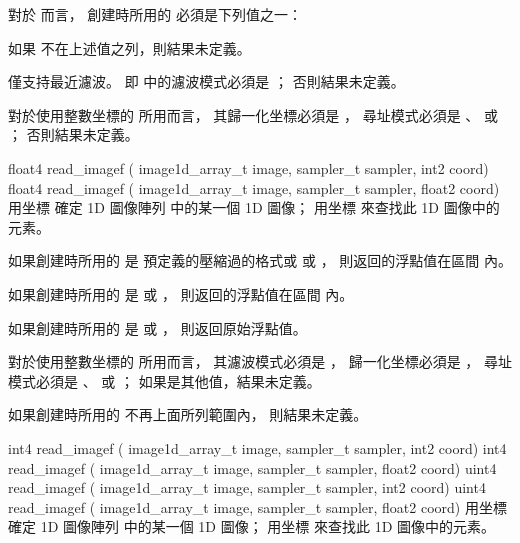 對於  而言，
創建時所用的  必須是下列值之一：
\startigBase[indentnext=no]
\item {}
\item {}
\item {}
\stopigBase
如果  不在上述值之列，則結果未定義。

 僅支持最近濾波。
即  中的濾波模式必須是 ；
否則結果未定義。

對於使用整數坐標的  所用而言，
其歸一化坐標必須是 ，
尋址模式必須是 、 
 或 ；
否則結果未定義。
\stopbuffer

float4 read_imagef (
	image1d_array_t image,
	sampler_t sampler,
	int2 coord)
float4 read_imagef (
	image1d_array_t image,
	sampler_t sampler,
	float2 coord)
\stopbuffer
{}
用坐標  確定 1D 圖像陣列  中的某一個 1D 圖像；
用坐標  來查找此 1D 圖像中的元素。

如果創建時所用的  是
預定義的壓縮過的格式或  或 ，
則返回的浮點值在區間 \math{[0.0 \cdots 1.0]} 內。

如果創建時所用的  是
  或 ，
則返回的浮點值在區間 \math{[-1.0 \cdots 1.0]} 內。

如果創建時所用的  是
  或 ，
則返回原始浮點值。

對於使用整數坐標的  所用而言，
其濾波模式必須是 ，
歸一化坐標必須是 ，
尋址模式必須是 、 
 或 ；
如果是其他值，結果未定義。

如果創建時所用的  不再上面所列範圍內，
則結果未定義。
\stopbuffer

int4 read_imagef (
	image1d_array_t image,
	sampler_t sampler,
	int2 coord)
int4 read_imagef (
	image1d_array_t image,
	sampler_t sampler,
	float2 coord)
uint4 read_imagef (
	image1d_array_t image,
	sampler_t sampler,
	int2 coord)
uint4 read_imagef (
	image1d_array_t image,
	sampler_t sampler,
	float2 coord)
\stopbuffer
{}
用坐標  確定 1D 圖像陣列  中的某一個 1D 圖像；
用坐標  來查找此 1D 圖像中的元素。

